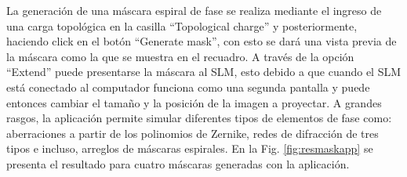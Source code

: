 La generación de una máscara espiral de fase se realiza mediante el ingreso de una carga topológica en la casilla ``Topological charge'' y posteriormente, haciendo click en el botón ``Generate mask'', con esto se dará una vista previa de la máscara como la que se muestra en el recuadro. A través de la opción ``Extend'' puede presentarse la máscara al SLM, esto debido a que cuando el SLM está conectado al computador funciona como una segunda pantalla y puede entonces cambiar el tamaño y la posición de la imagen a proyectar. A grandes rasgos, la aplicación permite simular diferentes tipos de elementos de fase como: aberraciones a partir de los polinomios de Zernike, redes de difracción de tres tipos e incluso, arreglos de máscaras espirales. En la Fig. \ref{fig:resmaskapp} se presenta el resultado para cuatro máscaras generadas con la aplicación.





